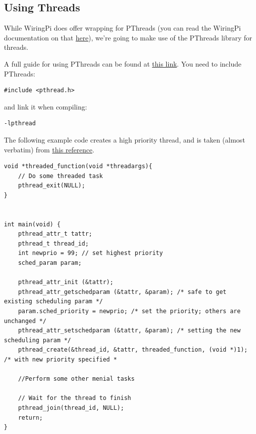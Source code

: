 \subsection{Using Threads}
While WiringPi does offer wrapping for PThreads (you can read the WiringPi documentation on that \href{http://wiringpi.com/reference/priority-interrupts-and-threads/}{here}), we're going to make use of the PThreads library for threads.

A full guide for using PThreads can be found at \href{https://docs.oracle.com/cd/E19455-01/806-5257/index.html}{this link}.
You need to include PThreads:
\begin{lstlisting}
#include <pthread.h>
\end{lstlisting}

and link it when compiling:
\begin{lstlisting}
-lpthread
\end{lstlisting}


The following example code creates a high priority thread, and is taken (almost verbatim) from \href{https://docs.oracle.com/cd/E19455-01/806-5257/attrib-16/index.html}{this reference}.

\begin{lstlisting}
void *threaded_function(void *threadargs){
    // Do some threaded task
    pthread_exit(NULL);
}


int main(void) {
    pthread_attr_t tattr;
    pthread_t thread_id;
    int newprio = 99; // set highest priority
    sched_param param;
    
    pthread_attr_init (&tattr);
    pthread_attr_getschedparam (&tattr, &param); /* safe to get existing scheduling param */
    param.sched_priority = newprio; /* set the priority; others are unchanged */
    pthread_attr_setschedparam (&tattr, &param); /* setting the new scheduling param */
    pthread_create(&thread_id, &tattr, threaded_function, (void *)1); /* with new priority specified *
    
    //Perform some other menial tasks
    
    // Wait for the thread to finish
    pthread_join(thread_id, NULL); 
    return;
}
\end{lstlisting}